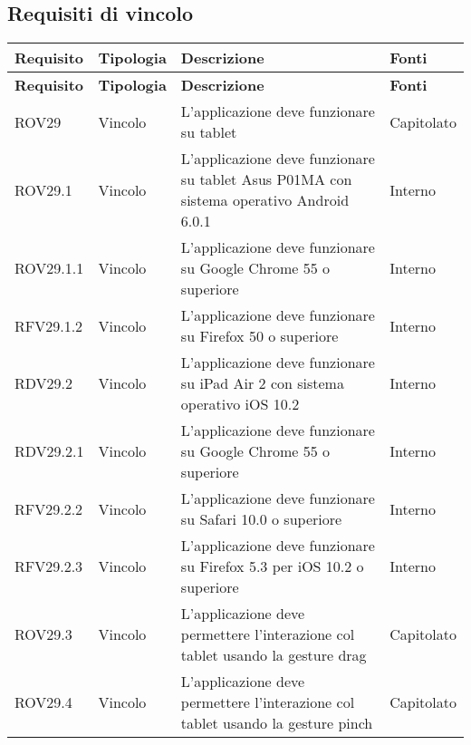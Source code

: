\subsection{Requisiti di vincolo}
\def\arraystretch{1.5}
\begin{longtable}{p{2cm}!{\VRule[1pt]}p{2cm}!{\VRule[1pt]}p{5cm}!{\VRule[1pt]}p{1.5cm}}
\color{white} \textbf{Requisito} & \color{white} \textbf{Tipologia} & \color{white} \textbf{Descrizione} & \color{white} \textbf{Fonti} \\
\endfirsthead
{}
\color{white} \textbf{Requisito} & \color{white} \textbf{Tipologia} & \color{white} \textbf{Descrizione} & \color{white} \textbf{Fonti} \\
\endhead
ROV29&Vincolo\newline  & L’applicazione deve funzionare su tablet & Capitolato \\
ROV29.1&Vincolo\newline  & L’applicazione deve funzionare su tablet Asus P01MA con sistema operativo Android 6.0.1 & Interno \\
ROV29.1.1&Vincolo\newline  & L’applicazione deve funzionare su Google Chrome 55 o superiore & Interno \\
RFV29.1.2&Vincolo\newline  & L’applicazione deve funzionare su Firefox 50 o superiore & Interno \\
RDV29.2&Vincolo\newline  & L’applicazione deve funzionare su iPad Air 2 con sistema operativo iOS 10.2 & Interno \\
RDV29.2.1&Vincolo\newline  & L’applicazione deve funzionare su Google Chrome 55 o superiore & Interno \\
RFV29.2.2&Vincolo\newline  & L’applicazione deve funzionare su Safari 10.0 o superiore & Interno \\
RFV29.2.3&Vincolo\newline  & L’applicazione deve funzionare su Firefox 5.3 per iOS 10.2 o superiore & Interno \\
ROV29.3&Vincolo\newline  & L'applicazione deve permettere l'interazione col tablet usando la gesture drag & Capitolato \\
ROV29.4&Vincolo\newline  & L'applicazione deve permettere l'interazione col tablet usando la gesture pinch & Capitolato \\

\end{longtable}
